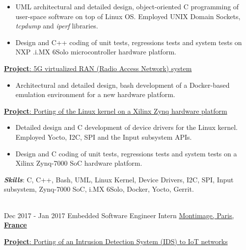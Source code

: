 \documentclass[letterpaper]{twentysecondcv} %
\begin{document}
\begin{twenty}
{            \vspace{2 mm}
            \begin{itemize}
                \item UML architectural and detailed design, object-oriented C programming of user-space software on top of Linux OS. Employed UNIX Domain Sockets, \textit{tcpdump} and \textit{iperf} libraries.
                \item Design and C++ coding of unit tests, regressions tests and system tests on NXP .i.MX 6Solo microcontroller hardware platform.
            \end{itemize}

            \vspace{2 mm}
            \underline{\textbf{Project}: 5G virtualized RAN (Radio Access Network) system}

            \vspace{2 mm}
            \begin{itemize}
                \item Architectural and detailed design, bash development of a Docker-based emulation environment for a new hardware platform.
            \end{itemize}

            \vspace{2 mm}
            \underline{\textbf{Project}: Porting of the Linux kernel on a Xilinx Zynq hardware platform}

            \vspace{2 mm}
            \begin{itemize}
                \item Detailed design and C development of device drivers for the Linux kernel. Employed Yocto, I2C, SPI and the Input subsystem APIs.
                \item Design and C coding of unit tests, regressions tests and system tests on a Xilinx Zynq-7000 SoC hardware platform.
            \end{itemize}

            \vspace{2 mm}
            \textbf{\textit{Skills}}: C, C++, Bash, UML, Linux Kernel, Device Drivers, I2C, SPI, Input subsystem, Zynq-7000 SoC, i.MX 6Solo, Docker, Yocto, Gerrit.
    }\\
    \twentyitem
        {Dec 2017 -}
        {Jan 2017}
        {Embedded Software Engineer Intern}
        {\href{https://www.montimage.com/}{Montimage, Paris, \textbf{France}}}
        {}
        {
            \vspace{2 mm}
            \underline{\textbf{Project}: Porting of an Intrusion Detection System (IDS) to IoT networks}

}
\end{twenty}
\end{document}
